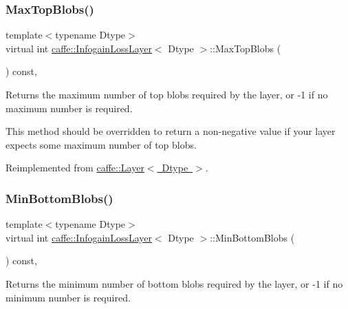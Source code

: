 \subsubsection{\texorpdfstring{Max\+Top\+Blobs()}{MaxTopBlobs()}\hspace{0.1cm}{\footnotesize\ttfamily [2/2]}}
{\footnotesize\ttfamily template$<$typename Dtype$>$ \\
virtual int \mbox{\hyperlink{classcaffe_1_1_infogain_loss_layer}{caffe\+::\+Infogain\+Loss\+Layer}}$<$ Dtype $>$\+::Max\+Top\+Blobs (\begin{DoxyParamCaption}{ }\end{DoxyParamCaption}) const\hspace{0.3cm}{\ttfamily [inline]}, {\ttfamily [virtual]}}



Returns the maximum number of top blobs required by the layer, or -\/1 if no maximum number is required. 

This method should be overridden to return a non-\/negative value if your layer expects some maximum number of top blobs. 

Reimplemented from \mbox{\hyperlink{classcaffe_1_1_layer_ac6c03df0b6e40e776c94001e19994a2e}{caffe\+::\+Layer$<$ Dtype $>$}}.

\mbox{\label{classcaffe_1_1_infogain_loss_layer_ad8a1ef702a695e379e5d0450369b4a0c}} 
\subsubsection{\texorpdfstring{Min\+Bottom\+Blobs()}{MinBottomBlobs()}\hspace{0.1cm}{\footnotesize\ttfamily [1/2]}}
{\footnotesize\ttfamily template$<$typename Dtype$>$ \\
virtual int \mbox{\hyperlink{classcaffe_1_1_infogain_loss_layer}{caffe\+::\+Infogain\+Loss\+Layer}}$<$ Dtype $>$\+::Min\+Bottom\+Blobs (\begin{DoxyParamCaption}{ }\end{DoxyParamCaption}) const\hspace{0.3cm}{\ttfamily [inline]}, {\ttfamily [virtual]}}



Returns the minimum number of bottom blobs required by the layer, or -\/1 if no minimum number is required. 

